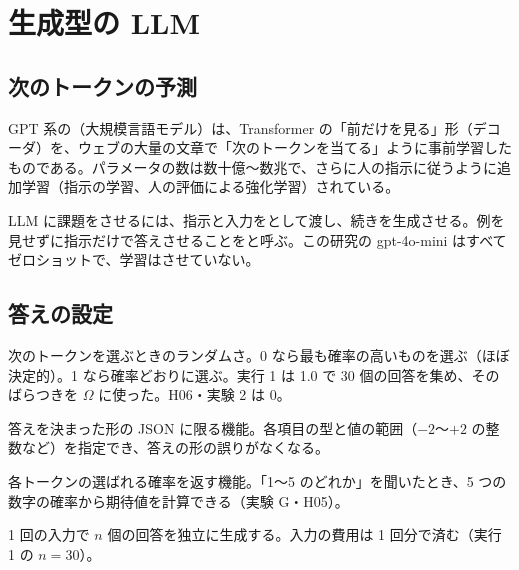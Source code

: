 \begin{iobox}
\end{iobox}

\section{生成型の LLM}

\subsection{次のトークンの予測}

GPT 系の（大規模言語モデル）は、Transformer の「前だけを見る」形（デコーダ）を、ウェブの大量の文章で「次のトークンを当てる」ように事前学習したものである。パラメータの数は数十億〜数兆で、さらに人の指示に従うように追加学習（指示の学習、人の評価による強化学習）されている。

LLM に課題をさせるには、指示と入力をとして渡し、続きを生成させる。例を見せずに指示だけで答えさせることをと呼ぶ。この研究の gpt-4o-mini はすべてゼロショットで、学習はさせていない。

\subsection{答えの設定}

\begin{description}[leftmargin=1.5em,style=nextline]
\item[温度（temperature）] 次のトークンを選ぶときのランダムさ。0 なら最も確率の高いものを選ぶ（ほぼ決定的）。1 なら確率どおりに選ぶ。実行 1 は 1.0 で 30 個の回答を集め、そのばらつきを $\Omega$ に使った。H06・実験 2 は 0。
\item[構造化出力] 答えを決まった形の JSON に限る機能。各項目の型と値の範囲（$-2$〜$+2$ の整数など）を指定でき、答えの形の誤りがなくなる。
\item[確率（logprobs）] 各トークンの選ばれる確率を返す機能。「1〜5 のどれか」を聞いたとき、5 つの数字の確率から期待値を計算できる（実験 G・H05）。
\item[複数の回答（n）] 1 回の入力で $n$ 個の回答を独立に生成する。入力の費用は 1 回分で済む（実行 1 の $n=30$）。
\end{description}

